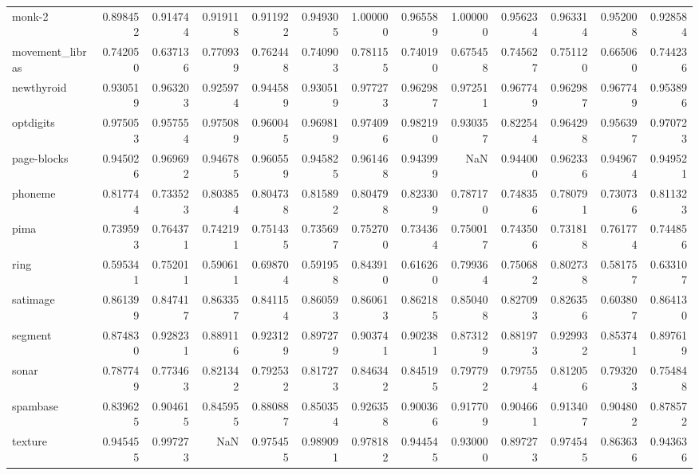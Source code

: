 \begin{tabular}{lrrrrrrrrrrrr}
monk-2          &   0.898452 &  0.914744 &  0.919118 &  0.911922 &  0.949305 &  1.000000 &  0.965589 &  1.000000 &  0.956234 &  0.963314 &  0.952008 &  0.928584 \\
movement\_libras &   0.742050 &  0.637136 &  0.770939 &  0.762448 &  0.740903 &  0.781155 &  0.740190 &  0.675458 &  0.745627 &  0.751120 &  0.665060 &  0.744236 \\
newthyroid      &   0.930519 &  0.963203 &  0.925974 &  0.944589 &  0.930519 &  0.977273 &  0.962987 &  0.972511 &  0.967749 &  0.962987 &  0.967749 &  0.953896 \\
optdigits       &   0.975053 &  0.957554 &  0.975089 &  0.960045 &  0.969819 &  0.974096 &  0.982190 &  0.930357 &  0.822544 &  0.964298 &  0.956397 &  0.970723 \\
page-blocks     &   0.945026 &  0.969692 &  0.946785 &  0.960559 &  0.945825 &  0.961468 &  0.943999 &       NaN &  0.944000 &  0.962336 &  0.949674 &  0.949521 \\
phoneme         &   0.817744 &  0.733523 &  0.803854 &  0.804738 &  0.815892 &  0.804798 &  0.823309 &  0.787170 &  0.748356 &  0.780791 &  0.730736 &  0.811323 \\
pima            &   0.739593 &  0.764371 &  0.742191 &  0.751435 &  0.735697 &  0.752700 &  0.734364 &  0.750017 &  0.743506 &  0.731818 &  0.761774 &  0.744856 \\
ring            &   0.595341 &  0.752011 &  0.590611 &  0.698704 &  0.591958 &  0.843910 &  0.616260 &  0.799364 &  0.750682 &  0.802738 &  0.581757 &  0.633107 \\
satimage        &   0.861399 &  0.847417 &  0.863357 &  0.841154 &  0.860593 &  0.860613 &  0.862185 &  0.850408 &  0.827093 &  0.826356 &  0.603807 &  0.864130 \\
segment         &   0.874830 &  0.928231 &  0.889116 &  0.923129 &  0.897279 &  0.903741 &  0.902381 &  0.873129 &  0.881973 &  0.929932 &  0.853741 &  0.897619 \\
sonar           &   0.787749 &  0.773463 &  0.821342 &  0.792532 &  0.817273 &  0.846342 &  0.845195 &  0.797792 &  0.797554 &  0.812056 &  0.793203 &  0.754848 \\
spambase        &   0.839625 &  0.904615 &  0.845955 &  0.880887 &  0.850354 &  0.926358 &  0.900366 &  0.917709 &  0.904661 &  0.913407 &  0.904802 &  0.878572 \\
texture         &   0.945455 &  0.997273 &       NaN &  0.975455 &  0.989091 &  0.978182 &  0.944545 &  0.930000 &  0.897273 &  0.974545 &  0.863636 &  0.943636 \\

\end{tabular}
